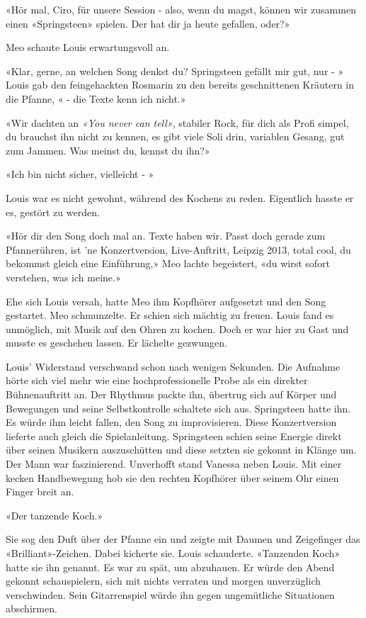 «Hör mal, Ciro, für unsere Session - also, wenn du magst, können wir
zusammen einen «Springsteen» spielen. Der hat dir ja heute gefallen,
oder?»

Meo schaute Louis erwartungsvoll an.

«Klar, gerne, an welchen Song denkst du? Springsteen gefällt mir gut, nur - »
Louis gab den feingehackten Rosmarin zu den bereits geschnittenen
Kräutern in die Pfanne, « - die Texte kenn ich nicht.»

«Wir dachten an \emph{«You never can tell»}, stabiler Rock, für dich
als Profi simpel, du brauchst ihn nicht zu kennen, es gibt viele Soli
drin, variablen Gesang, gut zum Jammen. Was meinst du, kennst du ihn?»

«Ich bin nicht sicher, vielleicht - »

Louis war es nicht gewohnt, während des Kochens zu reden.
Eigentlich hasste er es, gestört zu werden.

«Hör dir den Song doch mal an. Texte haben wir. Passt doch gerade zum
Pfannerühren, ist ’ne Konzertversion, Live-Auftritt, Leipzig 2013,
total cool, du bekommst gleich eine Einführung,» Meo lachte begeistert, «du
wirst sofort verstehen, was ich meine.»

Ehe sich Louis versah, hatte Meo ihm Kopfhörer aufgesetzt und den Song
gestartet. Meo schmunzelte. Er schien sich mächtig zu freuen.
Louis fand es unmöglich, mit Musik auf den Ohren zu kochen. Doch er war
hier zu Gast und musste es geschehen lassen. Er lächelte gezwungen.

Louis’ Widerstand verschwand schon nach wenigen Sekunden. Die Aufnahme hörte sich viel mehr wie eine
hochprofessionelle Probe als ein direkter Bühnenauftritt an. Der Rhythmus packte ihn, 
übertrug sich auf Körper und Bewegungen und seine Selbstkontrolle
schaltete sich aus. Springsteen hatte ihn. Es würde ihm
leicht fallen, den Song zu improvisieren. Diese Konzertversion lieferte auch gleich die Spielanleitung. 
Springsteen schien seine Energie direkt über seinen Musikern
auszuschütten und diese setzten sie gekonnt in Klänge um. Der Mann war
faszinierend.
Unverhofft stand Vanessa neben Louis. Mit einer kecken Handbewegung hob sie den rechten Kopfhörer über seinem Ohr einen Finger breit an.

«Der tanzende Koch.»

Sie sog den Duft über der Pfanne ein und zeigte mit Daumen und
Zeigefinger das «Brilliant»-Zeichen. Dabei kicherte sie.
Louis schauderte. «Tanzenden Koch» hatte sie ihn genannt. Es war zu spät, um abzuhauen.
Er würde den Abend gekonnt schauspielern, sich mit nichts verraten und
morgen unverzüglich verschwinden. Sein Gitarrenspiel würde ihn gegen ungemütliche Situationen abschirmen.

